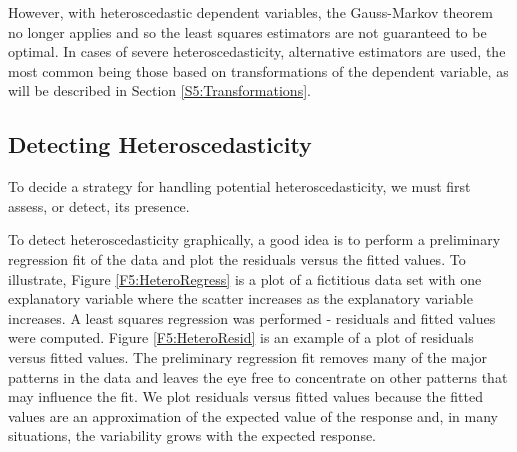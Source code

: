 However, with heteroscedastic dependent variables, the Gauss-Markov
theorem no longer applies and so the least squares estimators are
not guaranteed to be optimal. In cases of severe heteroscedasticity,
alternative estimators are used, the most common being those based
on transformations of the dependent variable, as will be described
in Section \ref{S5:Transformations}.

\subsection{Detecting Heteroscedasticity}

To decide a strategy for handling potential heteroscedasticity, we
must first assess, or detect, its presence.

To detect heteroscedasticity graphically, a good idea is to perform
a preliminary regression fit of the data and plot the residuals
versus the fitted values. To illustrate, Figure
\ref{F5:HeteroRegress} is a plot of a fictitious data set with one
explanatory variable where the scatter increases as the explanatory
variable increases. A least squares regression was performed -
residuals and fitted values were computed. Figure
\ref{F5:HeteroResid} is an example of a plot of residuals versus
fitted values. The preliminary regression fit removes many of the
major patterns in the data and leaves the eye free to concentrate on
other patterns that may influence the fit. We plot residuals versus
fitted values because the fitted values are an approximation of the
expected value of the response and, in many situations, the
variability grows with the expected response.


